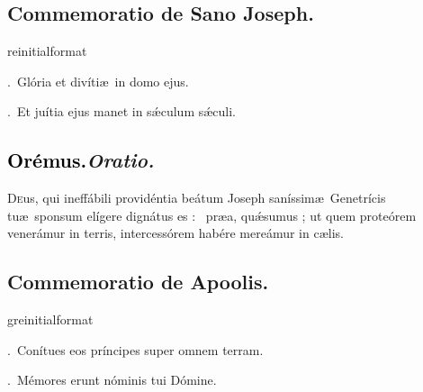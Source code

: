 \documentclass[12pt]{article} %
\newcommand{\myaboveinitial}[1]{%
    \expandafter\renewcommand\csname greinitialformat\endcsname[1]{%
        \fontsize{43}{43}\selectfont ##1
    }
    \gresetfirstlineaboveinitial{\textcolor{benred8}{\raisebox{6.0mm}{\small \textsc{\textbf{#1}}}}}{}
}
\newenvironment{response}{\leftskip 0in \setlength{\parindent}{0in}}{\vspace{1 mm}}
\let\oldgresixstar\gresixstar
\renewcommand{\gresixstar}{\textcolor{benred8}{\oldgresixstar}}
\let\oldVbar\Vbar
\renewcommand{\Vbar}{\textcolor{benred8}{\oldVbar .}}
\let\oldRbar\Rbar
\renewcommand{\Rbar}{\textcolor{benred8}{\oldRbar .}}
\def\capitulumSpace{\hspace{20 mm}}
\begin{document}

\subsection*{Commemoratio de Sano Joseph.}


\myaboveinitial{VIII}

\begin{response}
\Vbar\ Gl\'{o}ria et div\'{i}ti\ae\ in domo ejus.

\Rbar\ Et ju\'{i}tia ejus manet in s\'{\ae}culum s\'{\ae}culi.

\end{response}

\subsection*{\textcolor{black}{Or\'{e}mus.}\capitulumSpace \emph{Oratio.}}

\begin{response}\lettrine{D}{e}us, qui ineff\'{a}bili provid\'{e}ntia be\'{a}tum Joseph san\'{i}ssim\ae\ Genetr\'{i}cis tu\ae\ sponsum el\'{i}gere dign\'{a}tus es : \gresixstar\ pr\ae {}a, qu\'{\ae}sumus ; ut quem prote\'{o}rem vener\'{a}mur in terris, intercess\'{o}rem hab\'{e}re mere\'{a}mur in c\ae lis.

\end{response}


\subsection*{Commemoratio de Apoolis.}


\myaboveinitial{VIII}

\begin{response}
\Vbar\ Con\'{i}tues eos pr\'{i}ncipes super omnem terram.

\Rbar\ M\'{e}mores erunt n\'{o}minis tui D\'{o}mine.

\end{response}
\end{document}
